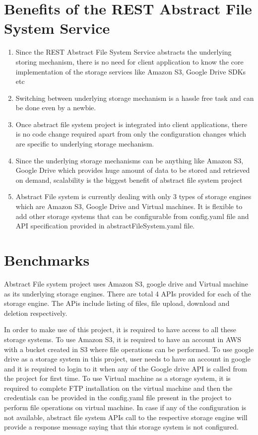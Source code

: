 \section{Benefits of the REST Abstract File System Service}
\begin{enumerate}
    \item Since the REST Abstract File System Service abstracts the underlying storing 
mechanism, there is no need for client application to know 
the core implementation of the storage 
services like Amazon S3, Google Drive SDKs etc
    
    \item Switching between underlying storage mechanism is a hassle free task 
and can be done even by a newbie.
    
    \item Once abstract file system project is integrated into client 
applications, there is no code change required apart from only the 
configuration changes which are specific to underlying storage mechanism.
    
    \item Since the underlying storage mechanisms can be anything like Amazon 
S3, Google Drive which 
provides huge amount of data to be stored and retrieved on demand, scalability 
is the biggest benefit of abstract file system
	project
	
\item Abstract File system is currently dealing with only 3 types of
  storage engines which are Amazon S3, Google Drive and Virtual
  machines.  It is flexible to add other storage systems that can be
  configurable from config.yaml file and API specification provided in
  abstractFileSystem.yaml file.
    
\end{enumerate}


\section{Benchmarks}

Abstract File system project uses Amazon S3, google drive and Virtual
machine as its underlying storage engines. There are total 4 APIs
provided for each of the storage engine. The APis include listing of
files, file upload, download and deletion respectively.

In order to make use of this project, it is required to have access to
all these storage systems. To use Amazon S3, it is required to have an
account in AWS with a bucket created in S3 where file operations can
be performed. To use google drive as a storage system in this project,
user needs to have an account in google and it is required to login to
it when any of the Google drive API is called from the project for
first time. To use Virtual machine as a storage system, it is required
to complete FTP installation on the virtual machine and then the
credentials can be provided in the config.yaml file present in the
project to perform file operations on virtual machine.  In case if any
of the configuration is not available, abstract file system APIs call
to the respective storage engine will provide a response message
saying that this storage system is not configured.

